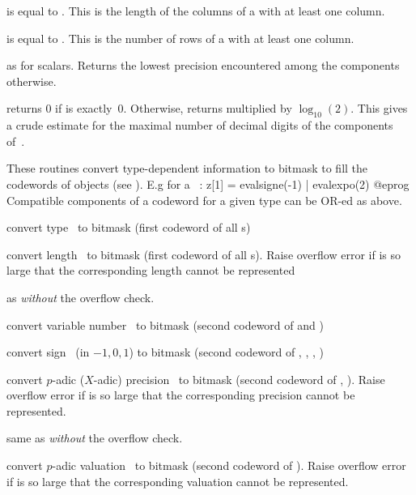  is equal to . This is the length
of the columns of a  with at least one column.

 is equal to . This is the number
of rows of a  with at least one column.

 as  for scalars. Returns the
lowest precision encountered among the components otherwise.

 returns 0 if  is exactly~0. Otherwise,
returns  multiplied by $\log_{10}(2)$. This gives a crude
estimate for the maximal number of decimal digits of the components
of~.

These routines convert type-dependent information to bitmask to fill the
codewords of  objects (see ). E.g for a
~:
\bprog
  z[1] = evalsigne(-1) | evalexpo(2)
@eprog
Compatible components of a codeword for a given type can be OR-ed as above.

 convert type~ to bitmask (first
codeword of all s)

 convert length~ to bitmask (first
codeword of all s). Raise overflow error if  is so large that
the corresponding length cannot be represented

 as  \emph{without} the overflow
check.

 convert variable number~ to bitmask
(second codeword of  and )

 convert sign~ (in $-1,0,1$) to bitmask
(second codeword of , , , )

 convert $p$-adic ($X$-adic) precision~
to bitmask (second codeword of , ). Raise overflow error
if  is so large that the corresponding precision cannot be
represented.

 same as  \emph{without} the
overflow check.

 convert $p$-adic valuation~ to
bitmask (second codeword of ). Raise overflow error if
 is so large that the corresponding valuation cannot be represented.


